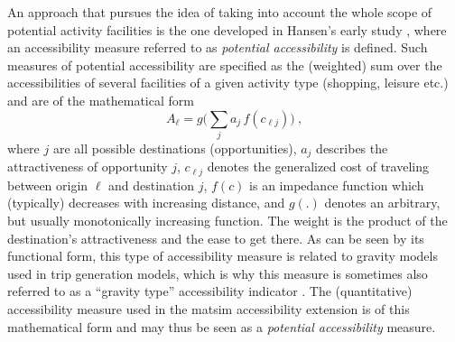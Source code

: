 An approach that pursues the idea of taking into account the whole scope of potential activity facilities is the one 
developed in Hansen's early study \citep{Hansen1959HowAccessibilityShapesLandUse}, where an accessibility 
measure referred to as \emph{potential accessibility} is defined. Such measures of potential accessibility are 
specified as the (weighted) sum over the 
accessibilities of several facilities of a given activity type (\eg shopping, leisure etc.) and are of the mathematical form
\begin{equation}
	A_\ell = g\Big( \sum_j a_j \, f(c_{\ell j}) \Big) \ ,
	\label{eq:accessibility:basic}
\end{equation}
where $j$ are all possible destinations (opportunities), $a_j$ describes the attractiveness of opportunity
$j$, $c_{\ell j}$ denotes the generalized cost of traveling between origin $\ell$ and destination $j$,
$f(c)$ is an impedance function which (typically) decreases with increasing distance, and $g(.)$ denotes
an arbitrary, but usually monotonically increasing function. 
The weight is the product of the destination's attractiveness and the ease to get there. As can be seen by its 
functional form, this type of accessibility measure is related to gravity models used in trip generation models, which 
is why this measure is sometimes also referred to as a ``gravity type'' accessibility indicator 
\citep{MorrisEtAl1979AccessibilityIndicators}. The (quantitative) accessibility measure used in the \gls{matsim} 
accessibility extension is of this mathematical form and may thus be seen as a \emph{potential accessibility} measure.

